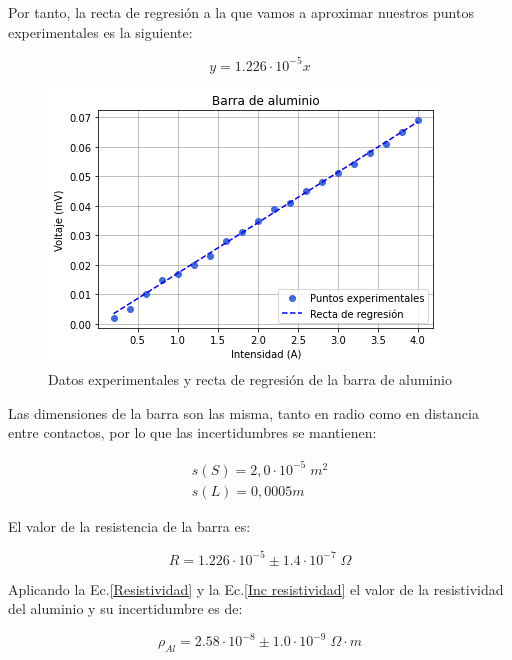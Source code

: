 \documentclass[a4paper,12pt,titlepage]{report}
\begin{document}
Por tanto, la recta de regresión a la que vamos a aproximar nuestros puntos experimentales es la siguiente:

\begin{equation}
    y = 1.226 \cdot 10^{-5}x
\end{equation}

\begin{figure}[h!]
    \centering
    \includegraphics[width=0.85\linewidth]{Images/plotAluminio.png}
    \caption{Datos experimentales y recta de regresión de la barra de aluminio}
\end{figure}

\newpage

Las dimensiones de la barra son las misma, tanto en radio como en distancia entre contactos, por lo que las incertidumbres se mantienen:

\begin{equation}
    \begin{gathered}
        s(S) = 2,0\cdot 10^{-5} \; m^2 \\
        s(L) = 0,0005m
    \end{gathered}
\end{equation}

El valor de la resistencia de la barra es:

\begin{equation}
    R = 1.226 \cdot 10^{-5} \pm 1.4 \cdot 10^{-7} \; \Omega
\end{equation}

Aplicando la Ec.\ref{Resistividad} y la Ec.\ref{Inc resistividad} el valor de la resistividad del aluminio y su incertidumbre es de:

\begin{equation}
    \rho_{Al} = 2.58 \cdot 10^{-8} \pm
    1.0\cdot 10^{-9} \; \Omega \cdot m
\end{equation}
\end{document}
